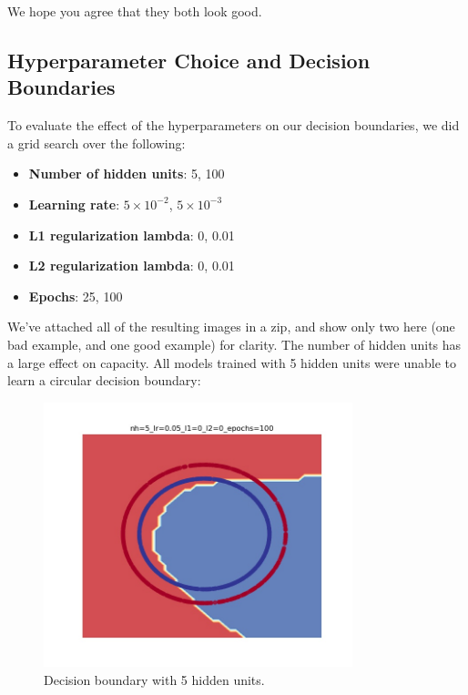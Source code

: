 \documentclass[reqno]{amsart}
\theoremstyle{definition}
\theoremstyle{remark}
\numberwithin{equation}{section}
\begin{document}
We hope you agree that they both look good. \\

\subsection{Hyperparameter Choice and Decision Boundaries}

To evaluate the effect of the hyperparameters on our decision boundaries, we did a grid search over the following:

\begin{itemize}
    \item \textbf{Number of hidden units}: 5, 100
    \item \textbf{Learning rate}: $5 \times 10^{-2}$, $5 \times 10^{-3}$
    \item \textbf{L1 regularization lambda}: 0, 0.01
    \item \textbf{L2 regularization lambda}: 0, 0.01
    \item \textbf{Epochs}: 25, 100
\end{itemize}

We've attached all of the resulting images in a zip, and show only two here (one bad example, and one good example) for clarity. The number of hidden units has a large effect on capacity. All models trained with 5 hidden units were unable to learn a circular decision boundary: \\

\begin{figure}[H]
    \centering
    \includegraphics[width=0.8\textwidth]{decision_bad.jpg}
    \caption{Decision boundary with 5 hidden units.}
    \label{fig:decision_bad}
\end{figure}
\end{document}
